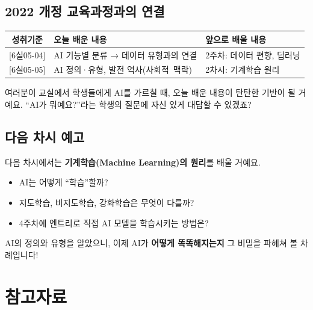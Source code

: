 \documentclass[11pt,a4paper]{article}
\begin{document}
\subsection{2022 개정 교육과정과의 연결}

\begin{center}
\begin{tabular}{|c|p{5.5cm}|p{4.5cm}|}
\hline
\rowcolor{tableheader}
\textbf{성취기준} & \textbf{오늘 배운 내용} & \textbf{앞으로 배울 내용} \\
\hline
{[6실05-04]} & AI 기능별 분류 → 데이터 유형과의 연결 & 2주차: 데이터 편향, 딥러닝 \\
\hline
{[6실05-05]} & AI 정의·유형, 발전 역사\mbox{(사회적 맥락)} & 2차시: 기계학습 원리 \\
\hline
\end{tabular}
\end{center}

 여러분이 교실에서 학생들에게 AI를 가르칠 때, 오늘 배운 내용이 탄탄한 기반이 될 거예요. ``AI가 뭐예요?''라는 학생의 질문에 자신 있게 대답할 수 있겠죠?

\subsection{ 다음 차시 예고}

다음 차시에서는 \textbf{기계학습(Machine Learning)의 원리}를 배울 거예요.

\begin{itemize}[leftmargin=2em]
\item AI는 어떻게 ``학습''할까?
\item 지도학습, 비지도학습, 강화학습은 무엇이 다를까?
\item 4주차에 엔트리로 직접 AI 모델을 학습시키는 방법은?
\end{itemize}

AI의 정의와 유형을 알았으니, 이제 AI가 \textbf{어떻게 똑똑해지는지} 그 비밀을 파헤쳐 볼 차례입니다!

\newpage
\section*{참고자료}
\end{document}
